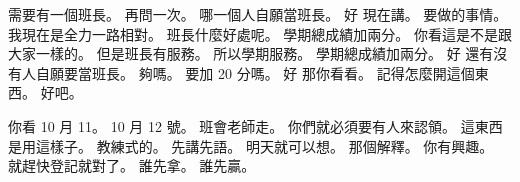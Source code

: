 \hypertarget{c01:cue:1489}{}需要有一個班長。
\hypertarget{c01:cue:1490}{}再問一次。
\hypertarget{c01:cue:1491}{}哪一個人自願當班長。
\hypertarget{c01:cue:1492}{}好 現在講。
\hypertarget{c01:cue:1493}{}要做的事情。
\hypertarget{c01:cue:1494}{}我現在是全力一路相對。
\hypertarget{c01:cue:1495}{}班長什麼好處呢。
\hypertarget{c01:cue:1496}{}學期總成績加兩分。
\hypertarget{c01:cue:1497}{}你看這是不是跟大家一樣的。
\hypertarget{c01:cue:1498}{}但是班長有服務。
\hypertarget{c01:cue:1499}{}所以學期服務。
\hypertarget{c01:cue:1500}{}學期總成績加兩分。
\hypertarget{c01:cue:1501}{}好 還有沒有人自願要當班長。
\hypertarget{c01:cue:1502}{}夠嗎。
\hypertarget{c01:cue:1503}{}要加 20 分嗎。
\hypertarget{c01:cue:1504}{}好 那你看看。
\hypertarget{c01:cue:1505}{}記得怎麼開這個東西。
\hypertarget{c01:cue:1506}{}好吧。

\hypertarget{c01:cue:1507}{}你看 10 月 11。
\hypertarget{c01:cue:1508}{}10 月 12 號。
\hypertarget{c01:cue:1509}{}班會老師走。
\hypertarget{c01:cue:1510}{}你們就必須要有人來認領。
\hypertarget{c01:cue:1511}{}這東西是用這樣子。
\hypertarget{c01:cue:1512}{}教練式的。
\hypertarget{c01:cue:1513}{}先講先語。
\hypertarget{c01:cue:1514}{}明天就可以想。
\hypertarget{c01:cue:1515}{}那個解釋。
\hypertarget{c01:cue:1516}{}你有興趣。
\hypertarget{c01:cue:1517}{}就趕快登記就對了。
\hypertarget{c01:cue:1518}{}誰先拿。
\hypertarget{c01:cue:1519}{}誰先贏。

